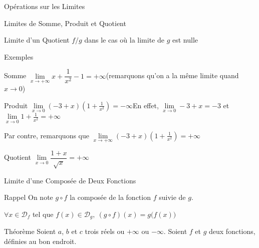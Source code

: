 \documentclass{cours}
\begin{document}
\begin{Gpartie}{Opérations sur les Limites}
\begin{Spartie}{Limites de Somme, Produit et Quotient}
\begin{SSpartie}{Limite d'un Quotient $f/g$ dans le cas où la limite de $g$ est nulle}
            \end{SSpartie}
            \begin{SSpartie}{Exemples} 
                \begin{SSSpartie}{Somme} 
                    $\lim\limits_{x\to+\infty}x+\dfrac{1}{x^2}-1=+\infty$\quad(remarquons qu'on a la même limite quand $x\to0$)
                \end{SSSpartie}
                \begin{SSSpartie}{Produit} 
                    $\lim\limits_{x\to0}\left(-3+x\right)\left(1+\frac{1}{x^2}\right)=-\infty$\qquad En effet, $\lim\limits_{x\to0}-3+x=-3$ et $\lim\limits_{x\to0}1+\frac{1}{x^2}=+\infty$
    
                    Par contre, remarquons que $\lim\limits_{x\to+\infty}\left(-3+x\right)\left(1+\frac{1}{x^2}\right)=+\infty$
                \end{SSSpartie}
                \begin{SSSpartie}{Quotient} 
                    $\lim\limits_{x\to0}\dfrac{1+x}{\sqrt{x}}=+\infty$
                \end{SSSpartie}
            \end{SSpartie}
        \end{Spartie}
        \pagebreak
        \begin{Spartie}{Limite d'une Composée de Deux Fonctions} 
            \begin{SSpartie}{Rappel} 
                On note $g\circ f$ la composée de la fonction $f$ suivie de $g$.

                $\forall x\in\mathcal{D}_f$ tel que $f(x)\in\mathcal{D}_g,~(g\circ f)(x)=g\big(f(x)\big)$
            \end{SSpartie}
            \begin{SSpartie}{Théorème} 
                Soient $a$, $b$ et $c$ trois réels ou $+\infty$ ou $-\infty$. Soient $f$ et $g$ deux fonctions, définies au bon endroit. 
                

\end{SSpartie}
\end{Spartie}
\end{Gpartie}
\end{document}
